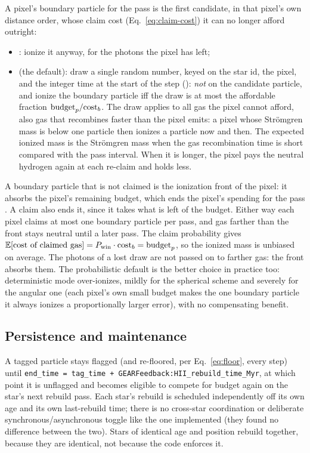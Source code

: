 A pixel's boundary particle for the
pass is the first candidate, in that pixel's own distance order, whose
claim cost (Eq.~\ref{eq:claim-cost}) it can no longer afford outright:
\begin{itemize}
  \item {}: ionize it
    anyway, for the photons the pixel has left;
  \item {} (the
    default): draw a single random number, keyed on the star id, the
    pixel, and the integer time at the start of the step
    (): \emph{not} on the candidate
    particle, and ionize the boundary particle iff the draw is at most
    the affordable fraction $\text{budget}_p/{\rm cost}_b$. The draw
    applies to all gas the pixel cannot afford, also gas that recombines
    faster than the pixel emits: a pixel whose Strömgren mass is below
    one particle then ionizes a particle now and then. The expected
    ionized mass is the Strömgren mass when the gas recombination time
    is short compared with the pass interval. When it is longer, the
    pixel pays the neutral hydrogen again at each re-claim and holds
    less.
\end{itemize}
A boundary particle that is not claimed is the ionization front of
the pixel: it absorbs the pixel's remaining budget, which ends the
pixel's spending for the pass \citep[Appendix~E]{Hopkins2018}. A
claim also ends it, since it takes what is left of the budget. Either way
each pixel claims at most one boundary particle per pass, and gas
farther than the front stays neutral until a later pass. The claim
probability gives
$\mathbb{E}[\text{cost of claimed gas}] = P_{\rm win}\cdot{\rm cost}_b
= \text{budget}_p$, so the ionized mass is unbiased on average. The
photons of a lost draw are not passed on to farther gas: the front
absorbs them. The probabilistic default is the better choice in
practice too: deterministic mode over-ionizes, mildly for the
spherical scheme and severely for the angular one (each pixel's own
small budget makes the one boundary particle it always ionizes a
proportionally larger error), with no compensating benefit.

\subsection{Persistence and maintenance}
\label{sec:persistence}

A tagged particle stays flagged (and re-floored, per
Eq.~\ref{eq:floor}, every step) until
\texttt{end\_time = tag\_time\allowbreak{} +
GEARFeedback:HII\_rebuild\_time\_Myr}, at which
point it is unflagged and becomes eligible to compete for budget again
on the star's next rebuild pass. Each star's rebuild is scheduled
independently off its own age and its own last-rebuild time; there is no cross-star coordination or
deliberate synchronous/asynchronous toggle like the one
\citet{Smith2021} implemented (they found no difference between the
two). Stars of identical age and position rebuild together, because
they are identical, not because the code enforces it.

